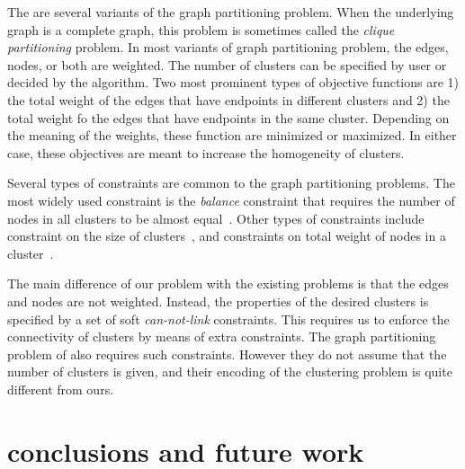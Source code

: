 \documentclass[conference]{IEEEtran}
\begin{document}
The are several variants of the graph partitioning problem. When the underlying graph is a complete graph, this problem is sometimes called the \emph{clique partitioning} problem. In most variants of graph partitioning problem, the edges, nodes, or both are weighted. The number of clusters can be specified by user or decided by the algorithm. Two most prominent types of objective functions are 1) the total weight of the edges that have endpoints in different clusters and 2) the total weight fo the edges that have endpoints in the same cluster. Depending on the meaning of the weights, these function are minimized or maximized. In either case, these objectives are meant to increase the homogeneity of clusters.  

Several types of constraints are common to the graph partitioning problems. The most widely used constraint is the \emph{balance} constraint that requires the number of nodes in all clusters to be almost equal~\cite{LabbeO10}. Other types of constraints include constraint on the size of clusters~\cite{FanP10}, and constraints on total weight of nodes in a cluster~\cite{FerreiraMSWW98}. 

The main difference of our problem with the existing problems is that the edges and nodes are not weighted. Instead, the properties of the desired clusters is specified by a set of soft \emph{can-not-link} constraints. This requires us to enforce the connectivity of clusters by means of extra constraints. The graph partitioning problem of \cite{Benati2017} also requires such constraints. However they do not assume that the number of clusters is given, and their encoding of the clustering problem is quite different from ours. 


\section{conclusions and future work}
\label{sec:conclusion}



\end{document}

